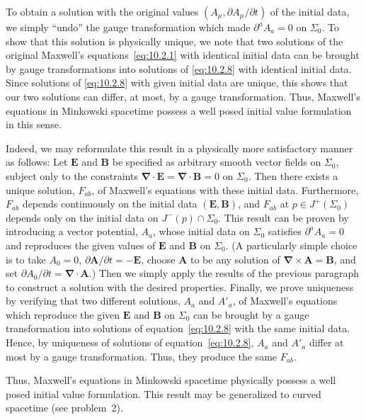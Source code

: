 To obtain a solution with the original values \((A_\mu,\partial A_\mu/\partial t)\)
of the initial data, we simply ``undo'' the gauge transformation which made
\(\partial^aA_a=0\) on \(\Sigma_0\). To show that this solution is physically
unique, we note that two solutions of the original Maxwell's
equations~\eqref{eq:10.2.1} with identical initial data can be brought by gauge
transformations into solutions of \eqref{eq:10.2.8} with identical initial data. Since
solutions of \eqref{eq:10.2.8} with given initial data are unique, this shows that our
two solutions can differ, at most, by a gauge transformation. Thus, Maxwell's
equations in Minkowski spacetime possess a well posed initial value formulation in
this sense.

Indeed, we may reformulate this result in a physically more satisfactory manner as
follows: Let \(\mathbf{E}\) and \(\mathbf{B}\) be specified as arbitrary smooth vector fields
on \(\Sigma_0\), subject only to the constraints
\(\boldsymbol{\nabla}\mathbin{\cdot}\mathbf{E}
=\boldsymbol{\nabla}\mathbin{\cdot}\mathbf{B}=0\) on \(\Sigma_0\). Then there exists a unique
solution, \(F_{ab}\), of Maxwell's equations with these initial data. Furthermore,
\(F_{ab}\) depends continuously on the initial data \((\mathbf{E},\mathbf{B})\), and \(F_{ab}\)
at \(p\in J^+(\Sigma_0)\) depends only on the initial data on
\(J^-(p)\cap\Sigma_0\). This result can be proven by introducing a vector potential,
\(A_a\), whose initial data on \(\Sigma_0\) satisfies \(\partial^aA_a=0\) and
reproduces the given values of \(\mathbf{E}\) and \(\mathbf{B}\) on \(\Sigma_0\). (A
particularly simple choice is to take \(A_0=0\),
\(\partial\mathbf{A}/\partial t=-\mathbf{E}\), choose \(\mathbf{A}\) to be any solution of
\(\boldsymbol{\nabla}\times\mathbf{A}=\mathbf{B}\), and set
\(\partial A_0/\partial t=\boldsymbol{\nabla}\mathbin{\cdot}\mathbf{A}\).) Then we simply apply
the results of the previous paragraph to construct a solution with the desired
properties. Finally, we prove uniqueness by verifying that two different solutions,
\(A_a\) and \(A'_a\), of Maxwell's equations which reproduce the given \(\mathbf{E}\)
and \(\mathbf{B}\) on \(\Sigma_0\) can be brought by a gauge transformation into
solutions of equation~\eqref{eq:10.2.8} with the same initial data. Hence, by
uniqueness of solutions of equation~\eqref{eq:10.2.8}, \(A_a\) and \(A'_a\) differ at
most by a gauge transformation. Thus, they produce the same \(F_{ab}\).

Thus, Maxwell's equations in Minkowski spacetime physically possess a well posed
initial value formulation. This result may be generalized to curved spacetime (see
problem~2).

